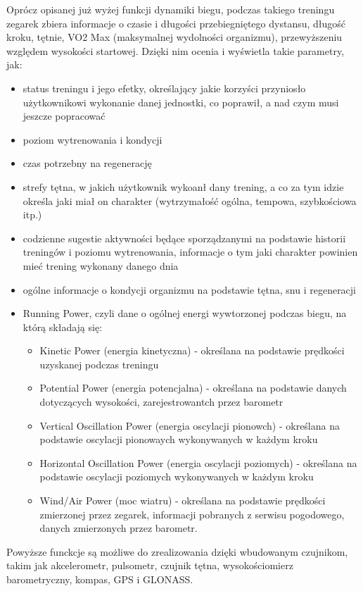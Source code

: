 \documentclass[a4paper,12pt,reqno]{article}
\begin{document}
Oprócz opisanej już wyżej funkcji dynamiki biegu, podczas takiego treningu zegarek zbiera informacje o czasie i długości przebiegniętego dystansu, długość kroku, tętnie, VO2 Max (maksymalnej wydolności organizmu), przewyższeniu względem wysokości startowej. Dzięki nim ocenia i wyświetla takie parametry, jak:
\begin{itemize}
	\item status treningu i jego efetky, określający jakie korzyści przyniosło użytkownikowi wykonanie danej jednostki, co poprawił, a nad czym musi jeszcze popracować
	\item poziom wytrenowania i kondycji
	\item czas potrzebny na regenerację
	\item strefy tętna, w jakich użytkownik wykoanł dany trening, a co za tym idzie określa jaki miał on charakter (wytrzymałość ogólna, tempowa, szybkościowa itp.)
	\item codzienne sugestie aktywności będące sporządzanymi na podstawie historii treningów i poziomu wytrenowania, informacje o tym jaki charakter powinien mieć trening wykonany danego dnia
	\item ogólne informacje o kondycji organizmu na podstawie tętna, snu i regeneracji
	\item Running Power, czyli dane o ogólnej energi wywtorzonej podczas biegu, na którą składają się:
	\begin{itemize}
		\item Kinetic Power (energia kinetyczna) - określana na podstawie prędkości uzyskanej podczas treningu
		\item Potential Power (energia potencjalna) - określana na podstawie danych dotyczących wysokości, zarejestrowantch przez barometr
		\item Vertical Oscillation Power (energia oscylacji pionowch) - określana na podstawie oscylacji pionowaych wykonywanych w każdym kroku
		\item Horizontal Oscillation Power (energia oscylacji poziomych) - określana na podstawie oscylacji poziomych wykonywanych w każdym kroku
		\item Wind/Air Power (moc wiatru) - określana na podstawie prędkości zmierzonej przez zegarek, informacji pobranych z serwisu pogodowego, danych zmierzonych przez barometr.
	\end{itemize}
\end{itemize}

Powyższe funckcje są możliwe do zrealizowania dzięki wbudowanym czujnikom, takim jak akcelerometr, pulsometr, czujnik tętna, wysokościomierz barometryczny, kompas, GPS i GLONASS.\\
\end{document}
